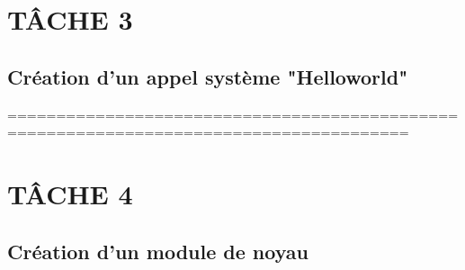 \part{TÂCHE 3}
\chapter{ Création d'un appel système "Helloworld" } \label{  Création d'un nouveau module "Helloworld" }

=======================================================================================

\part{TÂCHE 4}
\chapter{ Création d'un module de noyau} \label{ Création d'un module de noyau}













